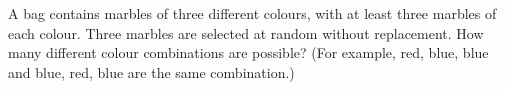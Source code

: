 A bag contains marbles of three different colours, with at least three marbles of each colour. Three marbles are selected at random without replacement. How many different colour combinations are possible? (For example, red, blue, blue and blue, red, blue are the same combination.)
